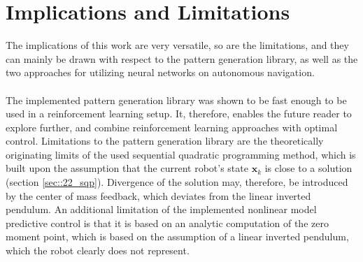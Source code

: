 \section{Implications and Limitations}
The implications of this work are very versatile, so are the limitations, and they can mainly be drawn with respect to the pattern generation library, as well as the two approaches for utilizing neural networks on autonomous navigation.\\\\
The implemented pattern generation library was shown to be fast enough to be used in a reinforcement learning setup. It, therefore, enables the future reader to explore further, and combine reinforcement learning approaches with optimal control. Limitations to the pattern generation library are the theoretically originating limits of the used sequential quadratic programming method, which is built upon the assumption that the current robot's state $\bm{x}_k$ is close to a solution (section \ref{sec::22_sqp}). Divergence of the solution may, therefore, be introduced by the center of mass feedback, which deviates from the linear inverted pendulum. An additional limitation of the implemented nonlinear model predictive control is that it is based on an analytic computation of the zero moment point, which is based on the assumption of a linear inverted pendulum, which the robot clearly does not represent.\\\\
